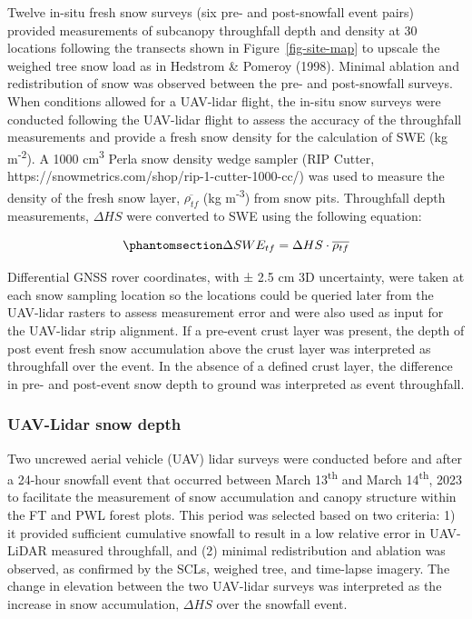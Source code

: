 \documentclass[
  letterpaper,
  DIV=11,
  numbers=noendperiod]{scrartcl}
\begin{document}
Twelve in-situ fresh snow surveys (six pre- and post-snowfall event
pairs) provided measurements of subcanopy throughfall depth and density
at 30 locations following the transects shown in
Figure~\ref{fig-site-map} to upscale the weighed tree snow load as in
Hedstrom \& Pomeroy (1998). Minimal ablation and redistribution of snow
was observed between the pre- and post-snowfall surveys. When conditions
allowed for a UAV-lidar flight, the in-situ snow surveys were conducted
following the UAV-lidar flight to assess the accuracy of the throughfall
measurements and provide a fresh snow density for the calculation of SWE
(kg m\textsuperscript{-2}). A 1000 cm\textsuperscript{3} Perla snow
density wedge sampler (RIP Cutter,
https://snowmetrics.com/shop/rip-1-cutter-1000-cc/) was used to measure
the density of the fresh snow layer, \(\overline{\rho_{tf}}\) (kg
m\textsuperscript{-3}) from snow pits. Throughfall depth measurements,
\(\Delta HS\) were converted to SWE using the following equation:

\begin{equation}\phantomsection\label{eq-swe-tf}{
\Delta SWE_{tf} = \Delta HS \cdot \overline{\rho_{tf}}
}\end{equation}

Differential GNSS rover coordinates, with ± 2.5 cm 3D uncertainty, were
taken at each snow sampling location so the locations could be queried
later from the UAV-lidar rasters to assess measurement error and were
also used as input for the UAV-lidar strip alignment. If a pre-event
crust layer was present, the depth of post event fresh snow accumulation
above the crust layer was interpreted as throughfall over the event. In
the absence of a defined crust layer, the difference in pre- and
post-event snow depth to ground was interpreted as event throughfall.

\subsubsection{UAV-Lidar snow depth}\label{uav-lidar-snow-depth}

Two uncrewed aerial vehicle (UAV) lidar surveys were conducted before
and after a 24-hour snowfall event that occurred between March
13\textsuperscript{th} and March 14\textsuperscript{th}, 2023 to
facilitate the measurement of snow accumulation and canopy structure
within the FT and PWL forest plots. This period was selected based on
two criteria: 1) it provided sufficient cumulative snowfall to result in
a low relative error in UAV-LiDAR measured throughfall, and (2) minimal
redistribution and ablation was observed, as confirmed by the SCLs,
weighed tree, and time-lapse imagery. The change in elevation between
the two UAV-lidar surveys was interpreted as the increase in snow
accumulation, \(\Delta HS\) over the snowfall event.
\end{document}
